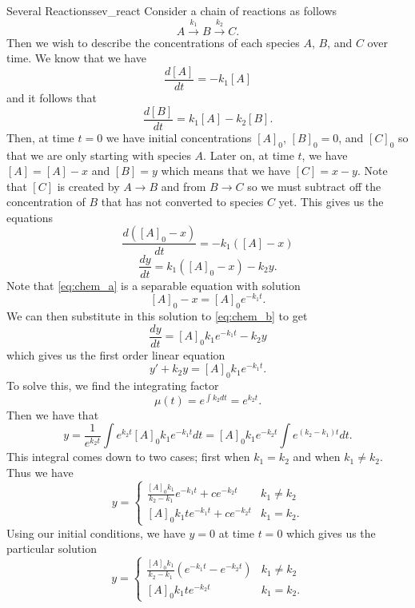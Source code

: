         \begin{ex}{Several Reactions}{sev_react}
        Consider a chain of reactions as follows
        \[
        A\xrightarrow{k_1} B \xrightarrow{k_2} C.
        \]
        Then we wish to describe the concentrations of each species $A$, $B$, and $C$ over time. We know that we have
        \[
        \frac{d[A]}{dt}=-k_1[A]
        \]
        and it follows that
        \[
        \frac{d[B]}{dt}=k_1[A]-k_2[B].
        \]
        Then, at time $t=0$ we have initial concentrations $[A]_0$, $[B]_0=0$, and $[C]_0$ so that we are only starting with species $A$. Later on, at time $t$, we have $[A]=[A]-x$ and $[B]=y$ which means that we have $[C]=x-y$.  Note that $[C]$ is created by $A\to B$ and from $B\to C$ so we must subtract off the concentration of $B$ that has not converted to species $C$ yet. This gives us the equations
        \begin{equation}
                        \frac{d([A]_0-x)}{dt}=-k_1([A]-x) \label{eq:chem_a}
        \end{equation}
        \begin{equation}
                        \frac{dy}{dt}=k_1([A]_0-x)-k_2y. \label{eq:chem_b}
        \end{equation}
        Note that \ref{eq:chem_a} is a separable equation with solution
        \[
        [A]_0-x=[A]_0e^{-k_1t}.
        \]
        We can then substitute in this solution to \ref{eq:chem_b} to get
        \[
        \frac{dy}{dt}=[A]_0k_1e^{-k_1t}-k_2y
        \]
        which gives us the first order linear equation
        \[
        y'+k_2y=[A]_0k_1e^{-k_1t}.
        \]
        To solve this, we find the integrating factor
        \[
        \mu(t)=e^{\int k_2 dt}=e^{k_2t}.
        \]
        Then we have that
        \[
        y=\frac{1}{e^{k_2t}}\int e^{k_2t}[A]_0k_1e^{-k_1t}dt=[A]_0k_1e^{-k_2t}\int e^{(k_2-k_1)t}dt.
        \]
        This integral comes down to two cases; first when $k_1=k_2$ and when $k_1\neq k_2$. Thus we have
        \[
        y=\begin{cases}
        \frac{[A]_0k_1}{k_2-k_1}e^{-k_1t}+ce^{-k_2t} & k_1\neq k_2\\
        [A]_0k_1te^{-k_1t}+ce^{-k_2t} & k_1=k_2.
        \end{cases}
        \]
        Using our initial conditions, we have $y=0$ at time $t=0$ which gives us the particular solution
        \[
        y=\begin{cases}
        \frac{[A]_0k_1}{k_2-k_1}\left( e^{-k_1t}-e^{-k_2t}\right) & k_1\neq k_2\\
        [A]_0k_1te^{-k_2t} & k_1=k_2.
        \end{cases}
        \]


\end{ex}
